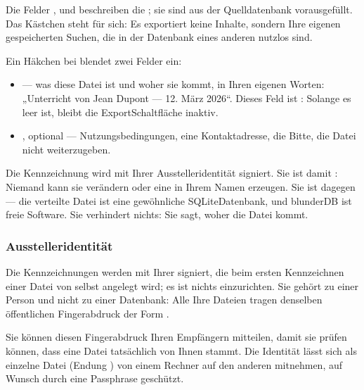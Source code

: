 \documentclass[letterpaper,10pt,german]{sphinxmanual}
\begin{document}
\sphinxAtStartPar
Die Felder ,  und  beschreiben die ; sie sind aus der Quelldatenbank vorausgefüllt. Das Kästchen  steht für sich: Es exportiert keine Inhalte, sondern Ihre eigenen gespeicherten Suchen, die in der Datenbank eines anderen nutzlos sind.

\sphinxAtStartPar
Ein Häkchen bei  blendet zwei Felder ein:
\begin{itemize}
\item {} 
\sphinxAtStartPar
{} — was diese Datei ist und woher sie kommt, in Ihren eigenen Worten: „Unterricht von Jean Dupont — 12. März 2026“. Dieses Feld ist : Solange es leer ist, bleibt die Export\sphinxhyphen{}Schaltfläche inaktiv.

\item {} 
\sphinxAtStartPar
{}, optional — Nutzungsbedingungen, eine Kontaktadresse, die Bitte, die Datei nicht weiterzugeben.

\end{itemize}

\sphinxAtStartPar
Die Kennzeichnung wird mit Ihrer Ausstelleridentität signiert. Sie ist damit : Niemand kann sie verändern oder eine in Ihrem Namen erzeugen. Sie ist dagegen  — die verteilte Datei ist eine gewöhnliche SQLite\sphinxhyphen{}Datenbank, und blunderDB ist freie Software. Sie verhindert nichts: Sie sagt, woher die Datei kommt.


\subsubsection{Ausstelleridentität}
\label{\detokenize{manuel:identite-d-emetteur}}
\sphinxAtStartPar
Die Kennzeichnungen werden mit Ihrer  signiert, die beim ersten Kennzeichnen einer Datei von selbst angelegt wird; es ist nichts einzurichten. Sie gehört zu einer Person und nicht zu einer Datenbank: Alle Ihre Dateien tragen denselben öffentlichen Fingerabdruck der Form .

\sphinxAtStartPar
Sie können diesen Fingerabdruck Ihren Empfängern mitteilen, damit sie prüfen können, dass eine Datei tatsächlich von Ihnen stammt. Die Identität lässt sich als einzelne Datei (Endung ) von einem Rechner auf den anderen mitnehmen, auf Wunsch durch eine Passphrase geschützt. 
\end{document}
